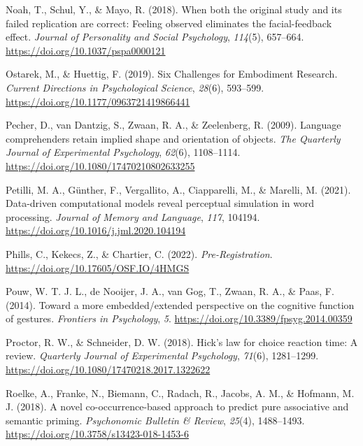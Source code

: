 \documentclass[
  man,floatsintext]{apa7}
\newlength{\cslhangindent}
\newlength{\cslentryspacingunit} %
\newenvironment{CSLReferences}[2] %
 {%
  \setlength{\parindent}{0pt}
  \ifodd #1
  \let\oldpar\par
  \def\par{\hangindent=\cslhangindent\oldpar}
  \fi
  \setlength{\parskip}{#2\cslentryspacingunit}
 }%
 {}
\begin{document}
\begin{CSLReferences}{1}{0}
\leavevmode{}%
Noah, T., Schul, Y., \& Mayo, R. (2018). When both the original study and its failed replication are correct: Feeling observed eliminates the facial-feedback effect. \emph{Journal of Personality and Social Psychology}, \emph{114}(5), 657--664. \url{https://doi.org/10.1037/pspa0000121}

\leavevmode{}%
Ostarek, M., \& Huettig, F. (2019). Six {Challenges} for {Embodiment Research}. \emph{Current Directions in Psychological Science}, \emph{28}(6), 593--599. \url{https://doi.org/10.1177/0963721419866441}

\leavevmode{}%
Pecher, D., van Dantzig, S., Zwaan, R. A., \& Zeelenberg, R. (2009). Language comprehenders retain implied shape and orientation of objects. \emph{The Quarterly Journal of Experimental Psychology}, \emph{62}(6), 1108--1114. \url{https://doi.org/10.1080/17470210802633255}

\leavevmode{}%
Petilli, M. A., Günther, F., Vergallito, A., Ciapparelli, M., \& Marelli, M. (2021). Data-driven computational models reveal perceptual simulation in word processing. \emph{Journal of Memory and Language}, \emph{117}, 104194. \url{https://doi.org/10.1016/j.jml.2020.104194}

\leavevmode{}%
Phills, C., Kekecs, Z., \& Chartier, C. (2022). \emph{Pre-{Registration}}. \url{https://doi.org/10.17605/OSF.IO/4HMGS}

\leavevmode{}%
Pouw, W. T. J. L., de Nooijer, J. A., van Gog, T., Zwaan, R. A., \& Paas, F. (2014). Toward a more embedded/extended perspective on the cognitive function of gestures. \emph{Frontiers in Psychology}, \emph{5}. \url{https://doi.org/10.3389/fpsyg.2014.00359}

\leavevmode{}%
Proctor, R. W., \& Schneider, D. W. (2018). Hick's law for choice reaction time: {A} review. \emph{Quarterly Journal of Experimental Psychology}, \emph{71}(6), 1281--1299. \url{https://doi.org/10.1080/17470218.2017.1322622}

\leavevmode{}%
Roelke, A., Franke, N., Biemann, C., Radach, R., Jacobs, A. M., \& Hofmann, M. J. (2018). A novel co-occurrence-based approach to predict pure associative and semantic priming. \emph{Psychonomic Bulletin \& Review}, \emph{25}(4), 1488--1493. \url{https://doi.org/10.3758/s13423-018-1453-6}


\end{CSLReferences}
\end{document}
